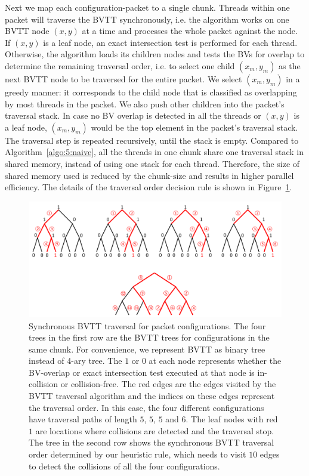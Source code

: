 Next we map each configuration-packet to a single chunk. Threads within one packet will traverse the BVTT synchronously, i.e. the algorithm works on one BVTT node $(x, y)$ at a time and processes the whole packet against the node. If $(x,y)$ is a leaf node, an exact intersection test is performed for each thread. Otherwise, the algorithm loads its children nodes and tests the BVs for overlap to determine the remaining traversal order, i.e. to select one child $(x_m, y_m)$ as the next BVTT node to be traversed for the entire packet. We select $(x_m, y_m)$ in a greedy manner: it corresponds to the child node that is classified as overlapping by most threads in the packet. We also push other children into the packet's traversal stack. In case no BV overlap is detected in all the
threads or $(x,y)$ is a leaf node, $(x_m, y_m)$ would be the top element in the packet's traversal stack.  The traversal
step is repeated recursively, until the stack is empty. Compared to Algorithm~\ref{algo:5:naive}, all the threads in one chunk share one
traversal stack in shared memory, instead of using one stack for each thread. Therefore, the size of shared memory used
is reduced by the $\text{chunk-size}$ and results in higher parallel efficiency. The details of the traversal order decision rule is shown in Figure~\ref{fig:5:packettraverse}.

\begin{figure}[htb]
  \centering
  \includegraphics[width=\linewidth]{figs/5/packettraverse.pdf}
  \caption[Synchronous BVTT traversal for packet configurations]{Synchronous BVTT traversal for packet configurations. The four trees in the first row are the BVTT trees for configurations in the same chunk. For convenience, we represent BVTT as binary tree instead of 4-ary tree. The $1$ or $0$ at each node represents whether the BV-overlap or exact intersection test executed at that node is in-collision or collision-free. The red edges are the edges visited by the BVTT traversal algorithm and the indices on these edges
  represent the traversal order. In this case, the four different configurations have traversal paths of length $5$, $5$, $5$ and $6$. The leaf nodes with red $1$ are locations where collisions are detected and  the traversal stop.
  The tree in the second row shows the synchronous BVTT traversal order determined by our heuristic rule, which needs to visit $10$ edges to detect the collisions of all the four configurations.}
  \label{fig:5:packettraverse}
\end{figure}

